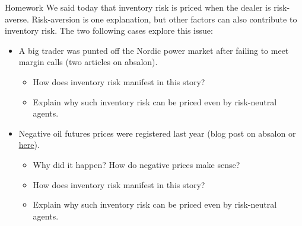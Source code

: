 \documentclass[english,10pt
,aspectratio=169
]{beamer}
\begin{document}
\begin{frame}{Homework}
	We said today that inventory risk is priced when the dealer is risk-averse. Risk-aversion is one explanation, but other factors can also contribute to inventory risk.
	The two following cases explore this issue:
	\begin{itemize}
		\item A big trader was punted off the Nordic power market after failing to meet margin calls (two articles on absalon).
		\begin{itemize}
			\item How does inventory risk manifest in this story?
			\item Explain why such inventory risk can be priced even by risk-neutral agents.
		\end{itemize}
		\item Negative oil futures prices were registered last year (blog post on absalon or \href{https://streetwiseprofessor.com/wti-wtf/}{\uline{here}}).
		\begin{itemize}
			\item Why did it happen? How do negative prices make sense?
			\item How does inventory risk manifest in this story?
			\item Explain why such inventory risk can be priced even by risk-neutral agents.
		\end{itemize}
	\end{itemize}
	

\end{frame}
\end{document}
